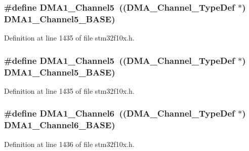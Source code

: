 \subsubsection[{\texorpdfstring{D\+M\+A1\+\_\+\+Channel5}{DMA1_Channel5}}]{\setlength{\rightskip}{0pt plus 5cm}\#define D\+M\+A1\+\_\+\+Channel5~(({\bf D\+M\+A\+\_\+\+Channel\+\_\+\+Type\+Def} $\ast$) {\bf D\+M\+A1\+\_\+\+Channel5\+\_\+\+B\+A\+SE})}\hypertarget{group___peripheral__declaration_ga06ff98ddef3c962795d2e2444004abff}{}\label{group___peripheral__declaration_ga06ff98ddef3c962795d2e2444004abff}


Definition at line 1435 of file stm32f10x.\+h.

\subsubsection[{\texorpdfstring{D\+M\+A1\+\_\+\+Channel5}{DMA1_Channel5}}]{\setlength{\rightskip}{0pt plus 5cm}\#define D\+M\+A1\+\_\+\+Channel5~(({\bf D\+M\+A\+\_\+\+Channel\+\_\+\+Type\+Def} $\ast$) {\bf D\+M\+A1\+\_\+\+Channel5\+\_\+\+B\+A\+SE})}\hypertarget{group___peripheral__declaration_ga06ff98ddef3c962795d2e2444004abff}{}\label{group___peripheral__declaration_ga06ff98ddef3c962795d2e2444004abff}


Definition at line 1435 of file stm32f10x.\+h.

\subsubsection[{\texorpdfstring{D\+M\+A1\+\_\+\+Channel6}{DMA1_Channel6}}]{\setlength{\rightskip}{0pt plus 5cm}\#define D\+M\+A1\+\_\+\+Channel6~(({\bf D\+M\+A\+\_\+\+Channel\+\_\+\+Type\+Def} $\ast$) {\bf D\+M\+A1\+\_\+\+Channel6\+\_\+\+B\+A\+SE})}\hypertarget{group___peripheral__declaration_gac013c4376e4797831b5ddd2a09519df8}{}\label{group___peripheral__declaration_gac013c4376e4797831b5ddd2a09519df8}


Definition at line 1436 of file stm32f10x.\+h.

